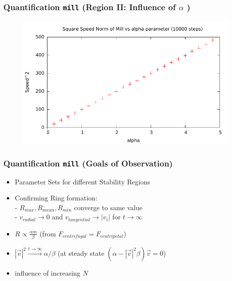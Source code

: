 \documentclass[compress]{beamer}
\begin{document}
\begin{frame}
	\frametitle{Quantification \texttt{mill} \small (Region II: Influence of \( \alpha \) )} \normalsize
	\begin{figure}[H]
		\includegraphics[width=1. \columnwidth]{../plots/mill_II_square_alpha_10000.pdf}
	\end{figure}
\end{frame}





\begin{frame}
	\frametitle{Quantification \texttt{mill} \small (Goals of Observation)} \normalsize
	\begin{itemize}
		\item Parameter Sets for different Stability Regions
		\item Confirming Ring formation: \\
			- \( R_{max}, R_{mean}, R_{min} \) converge to same value \\
			- \( v_{radial} \to 0 \) and \( v_{tangential} \to | v_{i} |  \) for \( t \to \infty \)
		\item  \( R \propto \frac{\alpha m}{\beta}\) \small (from  \( F_{centrifugal} = F_{centripetal} \)) \normalsize
		\item \( |\vec{v}|^{2} \xrightarrow{t \to \infty}  \alpha / \beta \) \small(at steady state \( (\alpha - |\vec{v}|^2 \beta ) \vec{v} = 0 \)) 
\normalsize
		\item influence of increasing \( N \)
	\end{itemize}
\end{frame}
\end{document}
